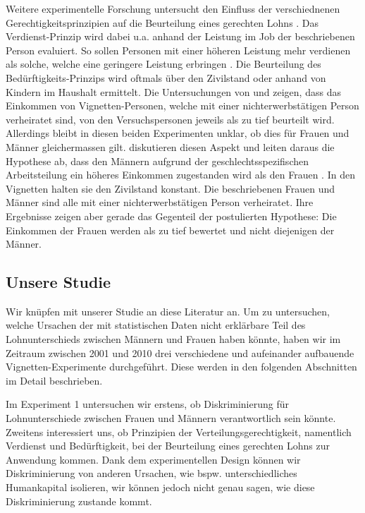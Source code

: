 \documentclass[a4paper,12pt]{article}
\renewcommand{\baselinestretch}{1.1}
\newif\ifcomments
\newcommand{\comment}[1]{%
    \ifcomments\marginpar{\renewcommand{\baselinestretch}{1}\tiny\hspace*{-1.1em}\colorbox{gray!20}%
    {\textcolor{red}{\parbox[t]{.9in}{\raggedright #1}}}}\fi}
\begin{document}
Weitere experimentelle Forschung untersucht den Einfluss der verschiednenen Gerechtigkeitsprinzipien auf die Beurteilung eines gerechten Lohns \citep{Jasso-Rossi-1977}. Das Verdienst-Prinzip wird dabei u.a. anhand der Leistung im Job der beschriebenen Person evaluiert. So sollen Personen mit einer höheren Leistung mehr verdienen als solche, welche eine geringere Leistung erbringen \citep{Auspurg-etal-2017,Gatskova-2015,Jann-2003}. Die Beurteilung des Bedürftigkeits-Prinzips wird oftmals über den Zivilstand oder anhand von Kindern im Haushalt ermittelt. Die Untersuchungen von \citet{Gatskova-2015} und \citet{Sauer-etal-2009} zeigen, dass das Einkommen von Vignetten-Personen, welche mit
einer nichterwerbstätigen Person verheiratet sind, von den Versuchspersonen
jeweils als zu tief beurteilt wird. Allerdings bleibt in diesen beiden
Experimenten unklar, ob dies für Frauen und Männer gleichermassen gilt. 
\citet{Shamon-Duelmer-2014} diskutieren diesen Aspekt und leiten daraus die Hypothese ab,
dass den Männern aufgrund der geschlechtsspezifischen Arbeitsteilung ein
höheres Einkommen zugestanden wird als den Frauen \citep[348]{Shamon-Duelmer-2014}.
In den Vignetten halten sie den Zivilstand
konstant. Die beschriebenen Frauen und Männer sind alle mit einer
nichterwerbstätigen Person verheiratet. Ihre Ergebnisse zeigen aber gerade das
Gegenteil der postulierten Hypothese: Die Einkommen der Frauen werden als zu
tief bewertet und nicht diejenigen der Männer. \comment{Da könnte auch ein
„Kompensations-Effekt“ eine Rolle spielen, denn dass in verheirateten Paaren
nur die Frau erwerbstätig ist, ist ungewöhnlich und hat vermutlich meist
gewichtige Gründe (z.B. Arbeitslosigkeit oder Krankheit des Mannes).}

\subsection{Unsere Studie}

Wir knüpfen mit unserer Studie an diese Literatur an. Um zu untersuchen, welche
Ursachen der mit statistischen Daten nicht erklärbare Teil des Lohnunterschieds
zwischen Männern und Frauen haben könnte, haben wir im Zeitraum zwischen 2001
und 2010 drei verschiedene und aufeinander aufbauende Vignetten-Experimente
durchgeführt. Diese werden in den folgenden Abschnitten im Detail beschrieben.

\comment{hier z.b. auf Auspurg et al. 2017 aufbauen -> habe ich jetzt weiter oben gemacht...}

Im Experiment 1 untersuchen wir erstens, ob Diskriminierung für
Lohnunterschiede zwischen Frauen und Männern verantwortlich sein könnte.
Zweitens interessiert uns, ob Prinzipien der Verteilungsgerechtigkeit, namentlich Verdienst und Bedürftigkeit, bei der
Beurteilung eines gerechten Lohns zur Anwendung kommen. Dank dem
experimentellen Design können wir Diskriminierung von anderen Ursachen, wie
bspw. unterschiedliches Humankapital isolieren, wir können jedoch nicht genau
sagen, wie diese Diskriminierung zustande kommt. 
\end{document}
